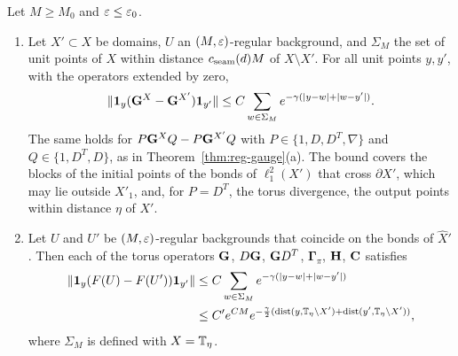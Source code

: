 \begin{theorem}[Locality]\label{thm:reg-locality}
Let $M\ge M_0$ and $\varepsilon\le\varepsilon_0$.
\begin{enumerate}[label=(\alph*)]
\item Let $X'\subset X$ be domains, $U$ an $(M,\varepsilon)$-regular background, and $\Sigma_M$ the set of unit points of $X$ within distance $c_{\rm seam}(d)M$ of $X\setminus X'$. For all unit points $y,y'$, with the operators extended by zero,
\[
\|\mathbf 1_y(\mathbf G^X-\mathbf G^{X'})\mathbf 1_{y'}\|\le C\sum_{w\in\Sigma_M}e^{-\gamma(|y-w|+|w-y'|)}.
\]
The same holds for $P\mathbf G^XQ-P\mathbf G^{X'}Q$ with $P\in\{1,D,D^T,\nabla\}$ and $Q\in\{1,D^T,D\}$, as in Theorem~\ref{thm:reg-gauge}(a). The bound covers the blocks of the initial points of the bonds of $\ell^2_1(X')$ that cross $\partial X'$, which may lie outside $X'_1$, and, for $P=D^T$, the torus divergence, the output points within distance $\eta$ of $X'$.
\item Let $U$ and $U'$ be $(M,\varepsilon)$-regular backgrounds that coincide on the bonds of $\hat X'$. Then each of the torus operators $\mathbf G$, $D\mathbf G$, $\mathbf G D^T$, $\boldsymbol\Gamma_\pi$, $\mathbf H$, $\mathbf C$ satisfies
\[
\begin{aligned}
\|\mathbf 1_y(F(U)-F(U'))\mathbf 1_{y'}\|&\le C\sum_{w\in\Sigma_M}e^{-\gamma(|y-w|+|w-y'|)}\\
&\le C'e^{CM}e^{-\frac\gamma2(\operatorname{dist}(y,\mathbb T_\eta\setminus X')+\operatorname{dist}(y',\mathbb T_\eta\setminus X'))},
\end{aligned}
\]
where $\Sigma_M$ is defined with $X=\mathbb T_\eta$.
\end{enumerate}
\end{theorem}

